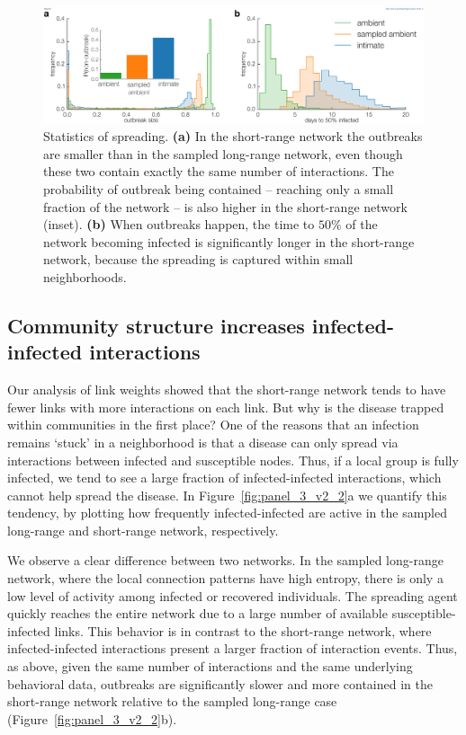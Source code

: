 \documentclass[fleqn,10pt]{wlscirep}
\begin{document}
\begin{figure}
\begin{center}
\includegraphics[width=\hsize]{panel_5}
\end{center}
\caption{Statistics of spreading.
%
\textbf{(a)} In the short-range network the outbreaks are smaller than in the sampled long-range network, even though these two contain exactly the same number of interactions.
The probability of outbreak being contained -- reaching only a small fraction of the network -- is also higher in the short-range network (inset).
\textbf{(b)} When outbreaks happen, the time to $50\%$ of the network becoming infected is significantly longer in the short-range network, because the spreading is captured within small neighborhoods.
\label{fig:panel_4}}
\end{figure}


\subsection*{Community structure increases infected-infected interactions}
Our analysis of link weights showed that the short-range network tends to have fewer links with more interactions on each link.
But why is the disease trapped within communities in the first place?
One of the reasons that an infection remains `stuck' in a neighborhood is that a disease can only spread via interactions between infected and susceptible nodes. 
Thus, if a local group is fully infected, we tend to see a large fraction of infected-infected interactions, which cannot help spread the disease.
In Figure~\ref{fig:panel_3_v2_2}a we quantify this tendency, by plotting how frequently infected-infected are active in the sampled long-range and short-range network, respectively.

We observe a clear difference between two networks.
In the sampled long-range network, where the local connection patterns have high entropy, there is only a low level of activity among infected or recovered individuals.
The spreading agent quickly reaches the entire network due to a large number of available susceptible-infected links.
This behavior is in contrast to the short-range network, where infected-infected interactions present a larger fraction of interaction events.
Thus, as above, given the same number of interactions and the same underlying behavioral data, outbreaks are significantly slower and more contained in the short-range network relative to the sampled long-range case (Figure~\ref{fig:panel_3_v2_2}b).
\end{document}
